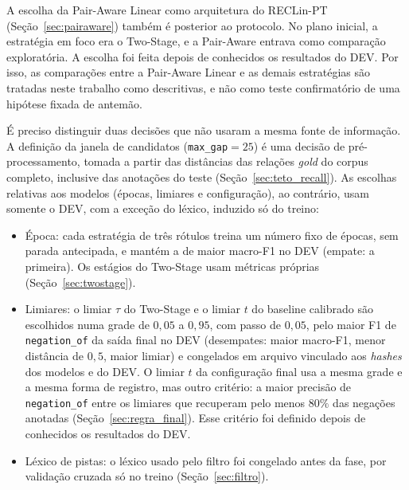 A escolha da Pair-Aware Linear como arquitetura do RECLin-PT
(Seção~\ref{sec:pairaware}) também é posterior ao protocolo. No plano inicial, a
estratégia em foco era o Two-Stage, e a Pair-Aware entrava como comparação
exploratória. A escolha foi feita depois de conhecidos os resultados do DEV. Por
isso, as comparações entre a Pair-Aware Linear e as demais estratégias são tratadas
neste trabalho como descritivas, e não como teste confirmatório de uma hipótese
fixada de antemão.

É preciso distinguir duas decisões que não usaram a mesma fonte de informação. A
definição da janela de candidatos (\texttt{max\_gap}$=25$) é uma decisão de
pré-processamento, tomada a partir das distâncias das relações \emph{gold} do corpus
completo, inclusive das anotações do teste (Seção~\ref{sec:teto_recall}). As
escolhas relativas aos modelos (épocas, limiares e configuração), ao contrário,
usam somente o DEV, com a exceção do léxico, induzido só do treino:

\begin{itemize}
  \item Época: cada estratégia de três rótulos treina um número fixo de
        épocas, sem parada antecipada, e mantém a de maior macro-F1 no DEV (empate:
        a primeira). Os estágios do Two-Stage usam métricas próprias
        (Seção~\ref{sec:twostage}).
  \item Limiares: o limiar $\tau$ do Two-Stage e o limiar $t$ do baseline
        calibrado são escolhidos numa grade de $0{,}05$ a $0{,}95$, com passo de
        $0{,}05$, pelo maior F1 de \texttt{negation\_of} da saída final no DEV
        (desempates: maior macro-F1, menor distância de $0{,}5$, maior limiar) e
        congelados em arquivo vinculado aos \emph{hashes} dos modelos e do DEV. O
        limiar $t$ da configuração final usa a mesma grade e a mesma forma de
        registro, mas outro critério: a maior precisão de \texttt{negation\_of}
        entre os limiares que recuperam pelo menos $80\%$ das negações anotadas
        (Seção~\ref{sec:regra_final}). Esse critério foi definido depois de
        conhecidos os resultados do DEV.
  \item Léxico de pistas: o léxico usado pelo filtro foi congelado antes
        da fase, por validação cruzada só no treino (Seção~\ref{sec:filtro}).
\end{itemize}

